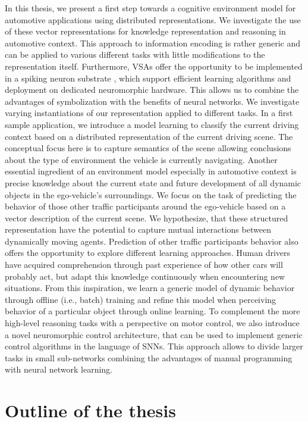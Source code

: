 In this thesis, we present a first step towards a cognitive environment model for automotive applications using distributed representations.
We investigate the use of these vector representations for knowledge representation and reasoning in automotive context.
This approach to information encoding is rather generic and can be applied to various different tasks with little modifications to the representation itself.
Furthermore, \acp{VSA} offer the opportunity to be implemented in a spiking neuron substrate \parencite{Eliasmith2013}, which support efficient learning algorithms and deployment on dedicated neuromorphic hardware.
This allows us to combine the advantages of symbolization with the benefits of neural networks.
We investigate varying instantiations of our representation applied to different tasks.
In a first sample application, we introduce a model learning to classify the current driving context based on a distributed representation of the current driving scene. 
The conceptual focus here is to capture semantics of the scene allowing conclusions about the type of environment the vehicle is currently navigating.
Another essential ingredient of an environment model especially in automotive context is precise knowledge about the current state and future development of all dynamic objects in the ego-vehicle's surroundings.
We focus on the task of predicting the behavior of those other traffic participants around the ego-vehicle based on a vector description of the current scene.
We hypothesize, that these structured representation have the potential to capture mutual interactions between dynamically moving agents.
Prediction of other traffic participants behavior also offers the opportunity to explore different learning approaches.
Human drivers have acquired comprehension through past experience of how other cars will probably act, but adapt this knowledge continuously when encountering new situations.
From this inspiration, we learn a generic model of dynamic behavior through offline (i.e., batch) training and refine this model when perceiving behavior of a particular object through online learning.
To complement the more high-level reasoning tasks with a perspective on motor control, we also introduce a novel neuromorphic control architecture, that can be used to implement generic control algorithms in the language of \acp{SNN}.
This approach allows to divide larger tasks in small sub-networks combining the advantages of manual programming with neural network learning.

\section{Outline of the thesis}%
\label{sec:outline_of_the_thesis}

